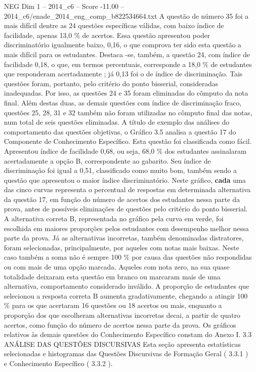 \begin{textsample}{NEG Dim 1 – 2014\_c6 – Score -11.00 – 2014\_c6/enade\_2014\_eng\_comp\_b822534664.txt}
A questão de número 35 foi a mais difícil dentre as 24 questões específicas válidas, com baixo índice de facilidade, apenas 13,0 \% de acertos.
Essa questão apresentou poder discriminatório igualmente baixo, 0,16, o que comprova ter sido esta questão a mais difícil para os estudantes.
Destaca -se, também, a questão 24, com índice de facilidade 0,18, o que, em termos percentuais, corresponde a 18,0 \% de estudantes que responderam acertadamente ; já 0,13 foi o de índice de discriminação.
Tais questões foram, portanto, pelo critério do ponto bisserial, consideradas inadequadas.
Por isso, as questões 24 e 35 foram eliminadas do cômputo da nota final.
Além destas duas, as demais questões com índice de discriminação fraco, questões 25, 28, 31 e 32 também não foram utilizadas no cômputo final das notas, num total de seis questões eliminadas.
A título de exemplo das análises do comportamento das questões objetivas, o Gráfico 3.5 analisa a questão 17 do Componente de Conhecimento Específico.
Esta questão foi classificada como fácil.
Apresentou índice de facilidade 0,68, ou seja, 68,0 \% dos estudantes assinalaram acertadamente a opção B, correspondente ao gabarito.
Seu índice de discriminação foi igual a 0,51, classificado como muito bom, também sendo a questão que apresentou o maior índice discriminatório.
Neste gráfico, \textbf{cada} uma das cinco curvas representa o percentual de respostas em determinada alternativa da questão 17, em função do número de acertos dos estudantes nessa parte da prova, antes de possíveis eliminações de questões pelo critério do ponto bisserial.
A alternativa correta B, representada no gráfico pela curva em verde, foi escolhida em maiores proporções pelos estudantes com desempenho melhor nessa parte da prova.
Já as alternativas incorretas, também denominadas distratores, foram selecionadas, principalmente, por aqueles com notas mais baixas.
Neste caso também a soma não é sempre 100 \% por causa das questões não respondidas ou com mais de uma opção marcada.
Aqueles com nota zero, na sua quase totalidade deixaram esta questão em branco ou marcaram mais de uma alternativa, comportamento considerado inválido.
A proporção de estudantes que selecionou a resposta correta B aumenta gradativamente, chegando a atingir 100 \% para os que acertaram 16 questões ou 18 acertos ou mais, enquanto a proporção dos que escolheram alternativas incorretas decai, a partir de quatro acertos, como função do número de acertos nessa parte da prova.
Os gráficos relativos às demais questões do Conhecimento Específico constam do Anexo I. 3.3 ANÁLISE DAS QUESTÕES DISCURSIVAS Esta seção apresenta estatísticas selecionadas e histogramas das Questões Discursivas de Formação Geral ( 3.3.1 ) e Conhecimento Específico ( 3.3.2 ).

\end{textsample}
